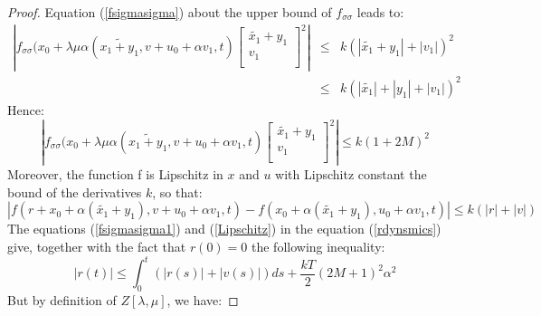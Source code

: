 \documentclass[a4paper,10pt]{article}
\begin{document}
\begin{proof}
    Equation (\ref{fsigmasigma}) about the upper bound of $f_{\sigma 
    \sigma}$ leads to:
    \begin{eqnarray*}
       \left|f_{\sigma \sigma}(x_{0}+\lambda\mu\alpha(\tilde{x_{1}+y_{1}},
		       v + u_{0} + \alpha v_{1},t)
		       \left[
		       \begin{array}
		       {c}
		           
		           \tilde{x_{1}} + y_{1}  \\
		           
		           v_{1}  \\
		        
		       \end{array}
		       \right]^{2}\right| 
		       & \leq & k(|\tilde{x_{1}} + y_{1}|+|v_{1}|)^{2}
		       \\
		       & \leq & k(|\tilde{x_{1}}| + |y_{1}|+|v_{1}|)^{2} 
        \end{eqnarray*}
	Hence:
 \begin{equation}
                    \left|f_{\sigma \sigma}(x_{0}+\lambda\mu\alpha(\tilde{x_{1}+y_{1}},
                    v + u_{0} + \alpha v_{1},t)
                    \left[
                    \begin{array}
                    {c}
                        
                        \tilde{x_{1}} + y_{1}  \\
                        
                        v_{1}  \\
                     
                    \end{array}
                    \right]^{2}\right| \leq k (1+2M)^{2}
             \label{fsigmasigma1}
 \end{equation}     
    Moreover, the function f is Lipschitz in $x$ and $u$ with 
    Lipschitz constant the bound of the derivatives $k$, so that:
   \begin{equation}
        |f(r+x_{0}+ \alpha ( \tilde{x_{1}} + y_{1}), v + u_{0} + \alpha v_{1}, t)
                           - f(x_{0}+ \alpha ( \tilde{x_{1}} + y_{1}), u_{0} + \alpha v_{1}, t)|
			   \leq k(|r|+|v|)
       \label{Lipschitz}
   \end{equation}
   The equations (\ref{fsigmasigma1}) and (\ref{Lipschitz}) in the 
   equation (\ref{rdynsmics}) give, together with the fact that 
   $r(0)=0$ the following inequality:
   \begin{equation}
       |r(t)| \leq \int_{0}^{t} (|r(s)|+|v(s)|)ds + 
       \frac{kT}{2}(2M+1)^{2} \alpha^{2}
       \label{rbound0}
   \end{equation}
   But by definition of $Z[\lambda,\mu]$, we have:
   

\end{proof}
\end{document}
